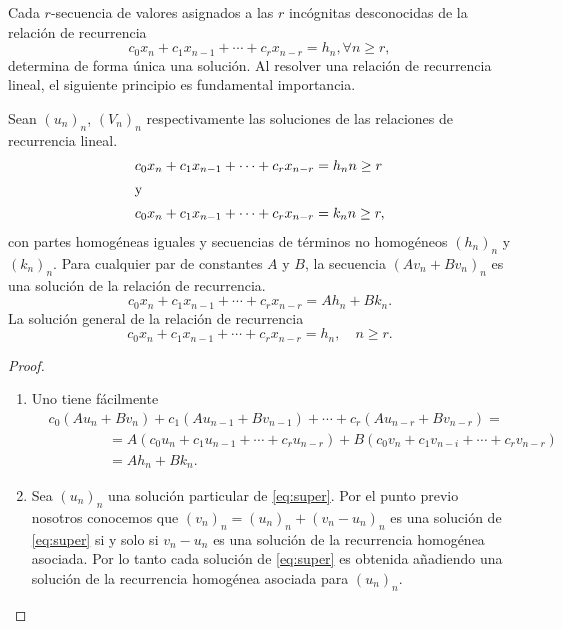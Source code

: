 \begin{remark}
	Cada $r$-secuencia de valores asignados a las $r$ incógnitas desconocidas de la relación de recurrencia
	\begin{equation*}
	c_{0}x_{n}+c_{1}x_{n-1}+\cdots+c_{r}x_{n-r}=h_{n},\forall n\geq r,
	\end{equation*}
	determina de forma única una solución. Al resolver una relación de recurrencia lineal, el siguiente principio es fundamental importancia.
\end{remark}

\begin{proposition}
	Sean $(u_{n})_n$, $(V_{n})_{n}$ respectivamente las soluciones de las relaciones de recurrencia lineal.
	\begin{align*}
	c_{0}x_{n}+c_{1}x_{n-1}+\cdots+c_{r}x_{n-r}&=h_{n}n\geq r\\
	\intertext{y}
	c_{0}x_{n}+c_{1}x_{n-1}+\cdots+c_{r}x_{n-r}&=k_{n}n\geq r,
	\end{align*}
	con partes homogéneas iguales y secuencias de términos no homogéneos $(h_{n})_{n}$ y $(k_{n})_{n}$. Para cualquier par de constantes $A$ y $B$, la secuencia $(Av_{n}+Bv_{n})_{n}$ es una solución de la relación de recurrencia. \[ c_{0}x_{n}+c_{1}x_{n-1}+\cdots+c_{r}x_{n-r}=Ah_{n}+Bk_{n}. \] La solución general de la relación de recurrencia
	\begin{equation}\label{eq:super}
	c_{0}x_{n}+c_{1}x_{n-1}+\cdots+c_{r}x_{n-r}=h_{n},\quad n\geq r.
	\end{equation}
\end{proposition}

\begin{proof}\leavevmode
	\begin{enumerate}
		\item Uno tiene fácilmente
		\begin{equation*}
		\begin{split}
		&c_{0}(Au_{n}+Bv_{n})+c_{1}(Au_{n-1}+Bv_{n-1})+\cdots+c_{r}(Au_{n-r}+Bv_{n-r})=\\
		&\phantom{c_{0}(Au_n+}=A(c_{0}u_{n}+c_{1}u_{n-1}+\cdots+c_{r}u_{n-r})+B(c_{0}v_{n}+c_{1}v_{n-i}+\cdots+c_{r}v_{n-r})\\
		&\phantom{c_{0}(Au_n+}=Ah_{n}+Bk_{n}.
		\end{split}
		\end{equation*}
		\item Sea $(u_{n})_{n}$ una solución particular de \eqref{eq:super}. Por el punto previo nosotros conocemos que $(v_{n})_{n}=(u_{n})_{n}+(v_{n}-u_{n})_{n}$ es una solución de \eqref{eq:super} si y solo si $v_{n}-u_{n}$ es una solución de la recurrencia homogénea asociada. Por lo tanto cada solución de \eqref{eq:super} es obtenida añadiendo una solución de la  recurrencia homogénea asociada para $(u_{n})_{n}$.
	\end{enumerate}
\end{proof}

